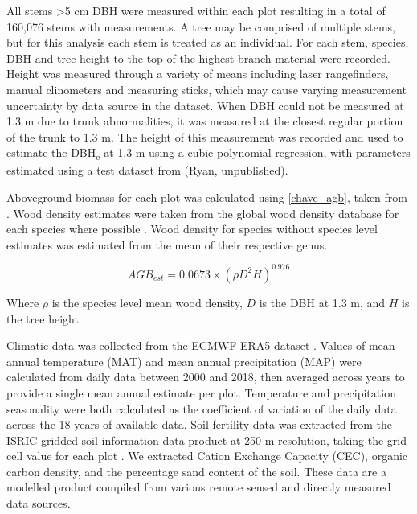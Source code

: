 \documentclass[11pt,a4paper]{article}
\begin{document}
All stems >5 cm DBH were measured within each plot resulting in a total of 160,076 stems with measurements. A tree may be comprised of multiple stems, but for this analysis each stem is treated as an individual. For each stem, species, DBH and tree height to the top of the highest branch material were recorded. Height was measured through a variety of means including laser rangefinders, manual clinometers and measuring sticks, which may cause varying measurement uncertainty by data source in the dataset. When DBH could not be measured at 1.3 m due to trunk abnormalities, it was measured at the closest regular portion of the trunk to 1.3 m. The height of this measurement was recorded and used to estimate the DBH\textsubscript{e} at 1.3 m using a cubic polynomial regression, with parameters estimated using a test dataset from (Ryan, unpublished).

Aboveground biomass for each plot was calculated using \autoref{chave_agb}, taken from \citet{Chave2014}. Wood density estimates were taken from the global wood density database for each species where possible \citep{Chave2009, Zanne2009}. Wood density for species without species level estimates was estimated from the mean of their respective genus. 

\begin{equation}
	AGB_{est} = 0.0673 \times (\rho D^{2} H)^{0.976}
	\label{chave_agb}
\end{equation}

Where $\rho$ is the species level mean wood density, $D$ is the DBH at 1.3 m, and $H$ is the tree height.

Climatic data was collected from the ECMWF ERA5 dataset \citep{}. Values of mean annual temperature (MAT) and mean annual precipitation (MAP) were calculated from daily data between 2000 and 2018, then averaged across years to provide a single mean annual estimate per plot. Temperature and precipitation seasonality were both calculated as the coefficient of variation of the daily data across the 18 years of available data. Soil fertility data was extracted from the ISRIC gridded soil information data product at 250 m resolution, taking the grid cell value for each plot \citep{Hengl2017}. We extracted Cation Exchange Capacity (CEC), organic carbon density, and the percentage sand content of the soil. These data are a modelled product compiled from various remote sensed and directly measured data sources. 

% 
% 
\end{document}
